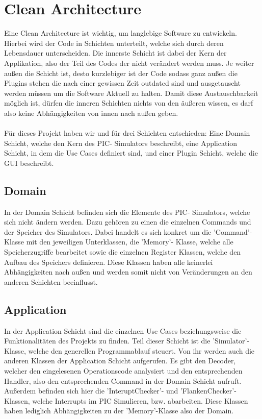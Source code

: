 \documentclass[12pt,a4paper,titlepage,ngerman,pdftex]{report}
\begin{document}
	\section{Clean Architecture}\label{sec:cleanarchitecture}
	
	Eine Clean Architecture ist wichtig, um langlebige Software zu entwickeln. Hierbei wird der Code in Schichten unterteilt, welche sich durch deren Lebensdauer unterscheiden. Die innerste Schicht ist dabei der Kern der Applikation, also der Teil des Codes der nicht verändert werden muss.
	Je weiter außen die Schicht ist, desto kurzlebiger ist der Code sodass ganz außen die Plugins stehen die nach einer gewissen Zeit outdated sind und ausgetauscht werden müssen um die Software Aktuell zu halten. 
	Damit diese Austauschbarkeit möglich ist, dürfen die inneren Schichten nichts von den äußeren wissen, es darf also keine Abhängigkeiten von innen nach außen geben.
	\\
	\\
	Für dieses Projekt haben wir und für drei Schichten entschieden: Eine Domain Schicht, welche den Kern des PIC- Simulators beschreibt, eine Application Schicht, in dem die Use Cases definiert sind, und einer Plugin Schicht, welche die GUI beschreibt.
	
	\subsection{Domain}
	In der Domain Schicht befinden sich die Elemente des PIC- Simulators, welche sich nicht ändern werden. Dazu gehören zu einen die einzelnen Commands und der Speicher des Simulators. Dabei handelt es sich konkret um die 'Command'- Klasse mit den jeweiligen Unterklassen, die 'Memory'- Klasse, 
	welche alle Speicherzugriffe bearbeitet sowie die einzelnen Register Klassen, welche den Aufbau des Speichers definieren. Diese Klassen haben alle keinerlei Abhängigkeiten nach außen und werden somit nicht von Veränderungen an den anderen Schichten beeinflusst.
	
	\subsection{Application}
	In der Application Schicht sind die einzelnen Use Cases beziehungsweise die Funktionalitäten des Projekts zu finden. Teil dieser Schicht ist die 'Simulator'- Klasse, welche den generellen Programmablauf steuert. Von ihr werden auch die anderen Klassen der Application Schicht aufgerufen.
	Es gibt den Decoder, welcher den eingelesenen Operationscode analysiert und den entsprechenden Handler, also den entsprechenden Command in der Domain Schicht aufruft. Außerdem befinden sich hier die 'InteruptChecker'- und 'FlankenChecker'-Klassen, welche Interrupts im PIC Simulieren, bzw. abarbeiten.
	Diese Klassen haben lediglich Abhängigkeiten zu der 'Memory'-Klasse also der Domain. 
	
\end{document}
